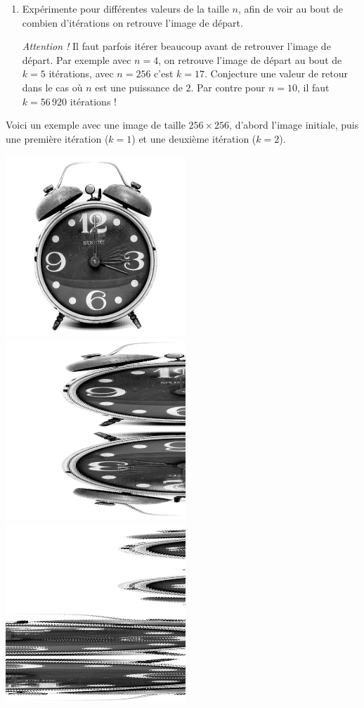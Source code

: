 \documentclass[11pt,class=report,crop=false]{standalone}
\begin{document}
\begin{activite}
\begin{enumerate}
  \item Expérimente pour différentes valeurs de la taille $n$, afin de voir au bout de combien d'itérations on retrouve l'image de départ. 
  
  \emph{Attention !} Il faut parfois itérer beaucoup avant de retrouver l'image de départ. Par exemple avec $n=4$, on retrouve l'image de départ au bout de $k=5$ itérations, avec $n=256$ c'est $k=17$. Conjecture une valeur de retour dans le cas où $n$ est une puissance de $2$. Par contre pour $n=10$, il faut $k = 56\,920$ itérations !
   
  
\end{enumerate}

Voici un exemple avec une image de taille $256 \times 256$, d'abord l'image initiale, puis une première itération ($k=1$) et une deuxième itération ($k=2$).
\begin{center}
\includegraphics[scale=\myscale,scale=0.4]{images_fiche/reveil_gimp_new_boul_0.png}\qquad
\includegraphics[scale=\myscale,scale=0.4]{images_fiche/reveil_gimp_new_boul_1.png}\qquad
\includegraphics[scale=\myscale,scale=0.4]{images_fiche/reveil_gimp_new_boul_2.png}

\end{center}
\end{activite}
\end{document}
